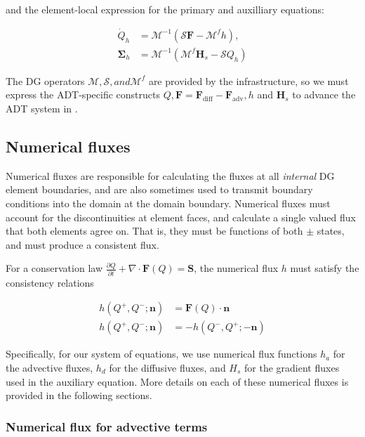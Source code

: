 \documentclass[11pt]{article}
\begin{document}
and the element-local expression for the primary and auxilliary equations:

\begin{align}
  \dot{Q}_h &= \mathcal{M}^{-1}\left(\mathcal{S} \mathbf{F} - \mathcal{M}^f h \right),\\
  \mathbf{\Sigma}_h &= \mathcal{M}^{-1}\left( \mathcal{M}^f \mathbf{H}_s - \mathcal{S} Q_h \right)
  \label{eq:algebraic}
\end{align}

The DG operators $\mathcal{M}, \mathcal{S}, and \mathcal{M}^f$ are provided by the \ceesdcode{} infrastructure, so we must express the ADT-specific constructs $Q, \mathbf{F} = \mathbf{F}_\text{diff} - \mathbf{F}_\text{adv}, h$ and $\mathbf{H}_s$ to advance the ADT system in \ceesdcode{}.

\subsection{Numerical fluxes}

Numerical fluxes are responsible for calculating the fluxes at all \textit{internal} DG element
boundaries, and are also sometimes used to transmit boundary conditions into the domain at the
domain boundary. Numerical fluxes must account for the discontinuities at element faces, and calculate
a single valued flux that both elements agree on.  That is, they must be functions
of both $\pm$ states, and must produce a consistent flux.

For a conservation law $\frac{\partial Q}{\partial t} + \nabla \cdot \mathbf{F}(Q) = \mathbf{S}$,
the numerical flux $h$ must satisfy the consistency relations

\begin{align}
   h(Q^+, Q^-; \mathbf{n}) &= \mathbf{F}(Q)\cdot\mathbf{n}  \\
   h(Q^+,Q^-;\mathbf{n}) &= -h(Q^-, Q^+;-\mathbf{n})
\end{align}

Specifically, for our system of equations, we use numerical flux functions $h_a$ for the
advective fluxes, $h_d$ for the diffusive fluxes, and $H_s$ for the gradient fluxes used in the
auxiliary equation.  More details on each of these numerical fluxes is provided in the following
sections.

\subsubsection{Numerical flux for advective terms}
\end{document}
